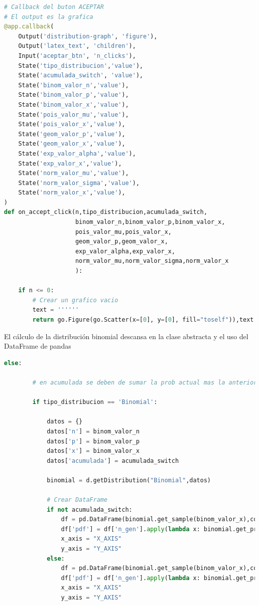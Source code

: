\documentclass[
	12pt, %
]{fphw}
\begin{document}
\begin{lstlisting}[language=Python,caption=Callback Boton Aceptar]
# Callback del buton ACEPTAR                                                                               
# El output es la grafica                                                                                  
@app.callback(
    Output('distribution-graph', 'figure'),
    Output('latex_text', 'children'),
    Input('aceptar_btn', 'n_clicks'),
    State('tipo_distribucion','value'),
    State('acumulada_switch', 'value'),
    State('binom_valor_n','value'),
    State('binom_valor_p','value'),
    State('binom_valor_x','value'),
    State('pois_valor_mu','value'),
    State('pois_valor_x','value'),
    State('geom_valor_p','value'),
    State('geom_valor_x','value'),
    State('exp_valor_alpha','value'),
    State('exp_valor_x','value'),
    State('norm_valor_mu','value'),
    State('norm_valor_sigma','value'),
    State('norm_valor_x','value'),
)
def on_accept_click(n,tipo_distribucion,acumulada_switch,
                    binom_valor_n,binom_valor_p,binom_valor_x,
                    pois_valor_mu,pois_valor_x,
                    geom_valor_p,geom_valor_x,
                    exp_valor_alpha,exp_valor_x,
                    norm_valor_mu,norm_valor_sigma,norm_valor_x
                    ):

    if n <= 0:
        # Crear un grafico vacio                                                                           
        text = ''''''
        return go.Figure(go.Scatter(x=[0], y=[0], fill="toself")),text
\end{lstlisting}

\newpage
El cálculo de la distribución binomial descansa en la clase abstracta y el uso del DataFrame de pandas

\begin{lstlisting}[language=Python,caption=Distribucion Binomial]
    else:

        # en acumulada se deben de sumar la prob actual mas la anterior                                    

        if tipo_distribucion == 'Binomial':

            datos = {}
            datos['n'] = binom_valor_n
            datos['p'] = binom_valor_p
            datos['x'] = binom_valor_x
            datos['acumulada'] = acumulada_switch

            binomial = d.getDistribution("Binomial",datos)

            # Crear DataFrame                                                                              
            if not acumulada_switch:
                df = pd.DataFrame(binomial.get_sample(binom_valor_x),columns=['n_gen'])
                df['pdf'] = df['n_gen'].apply(lambda x: binomial.get_probability(x))
                x_axis = "X_AXIS"
                y_axis = "Y_AXIS"
            else:
                df = pd.DataFrame(binomial.get_sample(binom_valor_x),columns=['n_gen'])
                df['pdf'] = df['n_gen'].apply(lambda x: binomial.get_probability_cdf(x))
                x_axis = "X_AXIS"
                y_axis = "Y_AXIS"

\end{lstlisting}
\end{document}
